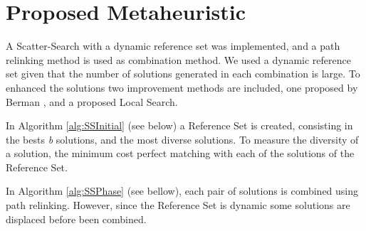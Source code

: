 \section{Proposed Metaheuristic}
A Scatter-Search
with a dynamic reference set
was implemented,
and a path relinking method
is used as combination method.
We used a dynamic reference set
given that the number of solutions generated
in each combination is large.
To enhanced the solutions
two improvement methods are included,
one proposed by Berman \cite{berman1987stochastic},
and a proposed Local Search.


In Algorithm \ref{alg:SSInitial} (see below)
a Reference Set is created,
consisting in the bests \textit{b} solutions,
and the most diverse  solutions.
To measure the diversity of a solution,
the minimum cost perfect matching
with each of the solutions of the Reference Set.


In Algorithm \ref{alg:SSPhase} (see bellow),
each pair of solutions
is combined using path relinking.
However,
since the Reference Set is dynamic
some solutions are displaced
before been combined.
